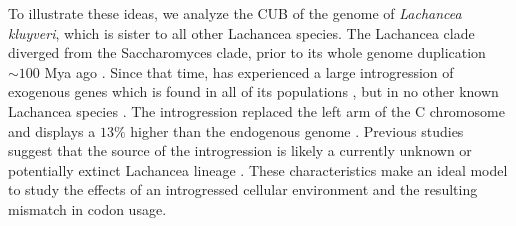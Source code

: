 \documentclass[fleqn,letterpaper]{article}
\begin{document}
To illustrate these ideas, we analyze the CUB of the genome of \emph{Lachancea kluyveri}, which is sister to all other Lachancea species.
The Lachancea clade diverged from the Saccharomyces clade, prior to its whole genome duplication $\sim 100$ Mya ago \citep{MHM2015,Beimforde2014}.
Since that time, \kluyveri has experienced a large introgression of exogenous genes which is found in all of its populations \citep{friedrich2015}, but in no other known Lachancea species \citep{vakirlis2016}.
The introgression replaced the left arm of the C chromosome and displays a $13 \%$ higher \GC than the endogenous \kluyveri genome \citep{payen2009, friedrich2015}.
Previous studies suggest that the source of the introgression is likely a currently unknown or potentially extinct Lachancea lineage \citep{payen2009, friedrich2015, vakirlis2016, brion2017}.
These characteristics make \kluyveri an ideal model to study the effects of an introgressed cellular environment and the resulting mismatch in codon usage.
\end{document}
